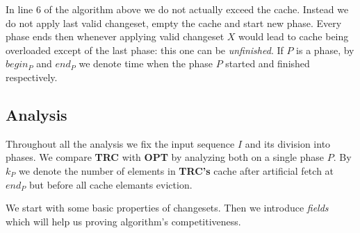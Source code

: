 In line 6 of the algorithm above we do not actually exceed the cache. Instead 
we do not apply last valid changeset, empty the cache and start new phase. 
Every phase ends then whenever applying valid changeset $X$ would lead to cache 
being overloaded except of the last phase: this one can be \textit{unfinished}. 
If $P$ is a phase, by $begin_P$ and $end_P$ we denote time when the phase $P$ 
started and finished respectively.

\subsection{Analysis}
Throughout all the analysis we fix the input sequence $I$ and its division into 
phases. We compare \textbf{TRC} with \textbf{OPT} by analyzing both on a single 
phase $P$. By $k_P$ we denote the number of elements in \textbf{TRC's} cache 
after artificial fetch at $end_P$ but before all cache elemants eviction.

We start with some basic properties of changesets. Then we introduce 
\textit{fields} which will help us proving algorithm's competitiveness.


